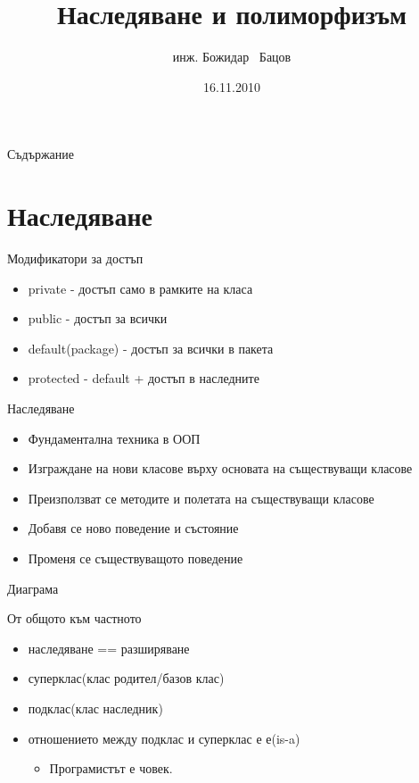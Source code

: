 \documentclass{beamer}
\title{Наследяване и полиморфизъм}
\author{инж. Божидар ~Бацов}
\institute{Drow Ltd.}
\date{16.11.2010}
\begin{document}
\begin{frame}
  \titlepage
\end{frame}

\begin{frame}{Съдържание}
  \tableofcontents[pausesections]
\end{frame}

\section{Наследяване}

\begin{frame}{Модификатори за достъп}
  \begin{itemize}
  \item private - достъп само в рамките на класа
  \item public - достъп за всички
  \item default(package) - достъп за всички в пакета
  \item protected - default + достъп в наследните
  \end{itemize}
\end{frame}

\begin{frame}{Наследяване}
  \transdissolve
  \begin{itemize}
  \item Фундаментална техника в ООП
  \item Изграждане на нови класове върху основата на съществуващи
    класове
  \item Преизползват се методите и полетата на съществуващи класове
  \item Добавя се ново поведение и състояние
  \item Променя се съществуващото поведение
  \end{itemize}
\end{frame}

\begin{frame}{Диаграма}
  \transdissolve
  
\end{frame}

\begin{frame}{От общото към частното}
  \transdissolve
  \begin{itemize}
  \item наследяване == разширяване
  \item суперклас(клас родител/базов клас)
  \item подклас(клас наследник)
  \item отношението между подклас и суперклас е е(is-a)
    \begin{itemize}
      \item Програмистът е човек.
    \end{itemize}

  \end{itemize}
\end{frame}
\end{document}
